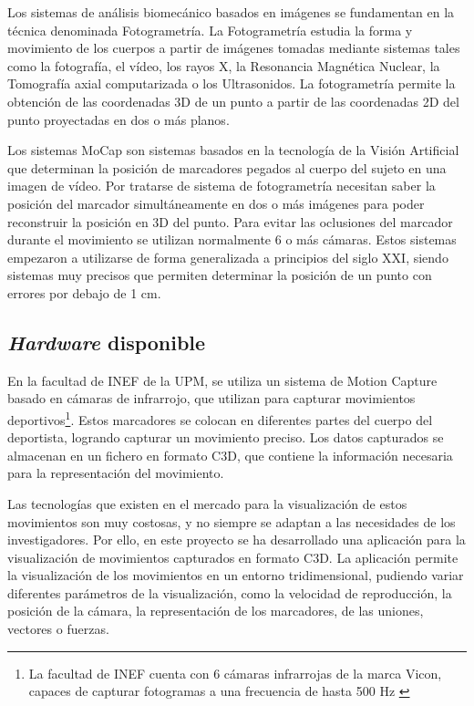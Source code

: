 Los sistemas de análisis biomecánico basados en imágenes se fundamentan en la técnica denominada Fotogrametría. La Fotogrametría estudia la forma y movimiento de los cuerpos a partir de imágenes tomadas mediante sistemas tales como la fotografía, el vídeo, los rayos X, la Resonancia Magnética Nuclear, la Tomografía axial computarizada o los Ultrasonidos. La fotogrametría permite la obtención de las coordenadas 3D de un punto a partir de las coordenadas 2D del punto proyectadas en dos o más planos.

Los sistemas \ac{MoCap} son sistemas basados en la tecnología de la Visión Artificial que determinan la posición de marcadores pegados al cuerpo del sujeto en una imagen de vídeo. Por tratarse de sistema de fotogrametría necesitan saber la posición del marcador simultáneamente en dos o más imágenes para poder reconstruir la posición en 3D del punto. Para evitar las oclusiones del marcador durante el movimiento se utilizan normalmente 6 o más cámaras. Estos sistemas empezaron a utilizarse de forma generalizada a principios del siglo XXI, siendo sistemas muy precisos que permiten determinar la posición de un punto con errores por debajo de 1 cm. 

\subsection{\textit{Hardware} disponible}
En la facultad de \ac{INEF} de la \ac{UPM}, se utiliza un sistema de Motion Capture basado en cámaras de infrarrojo, que utilizan para capturar movimientos deportivos\footnote{La facultad de INEF cuenta con 6 cámaras infrarrojas de la marca Vicon, capaces de capturar fotogramas a una frecuencia de hasta 500 \ac{Hz} \autocite{FacultadCienciasActividad}}. Estos marcadores se colocan en diferentes partes del cuerpo del deportista, logrando capturar un movimiento preciso. Los datos capturados se almacenan en un fichero en formato \ac{C3D}, que contiene la información necesaria para la representación del movimiento.

Las tecnologías que existen en el mercado para la visualización de estos movimientos son muy costosas, y no siempre se adaptan a las necesidades de los investigadores. Por ello, en este proyecto se ha desarrollado una aplicación para la visualización de movimientos capturados en formato \ac{C3D}. La aplicación permite la visualización de los movimientos en un entorno tridimensional, pudiendo variar diferentes parámetros de la visualización, como la velocidad de reproducción, la posición de la cámara, la representación de los marcadores, de las uniones, vectores o fuerzas.


